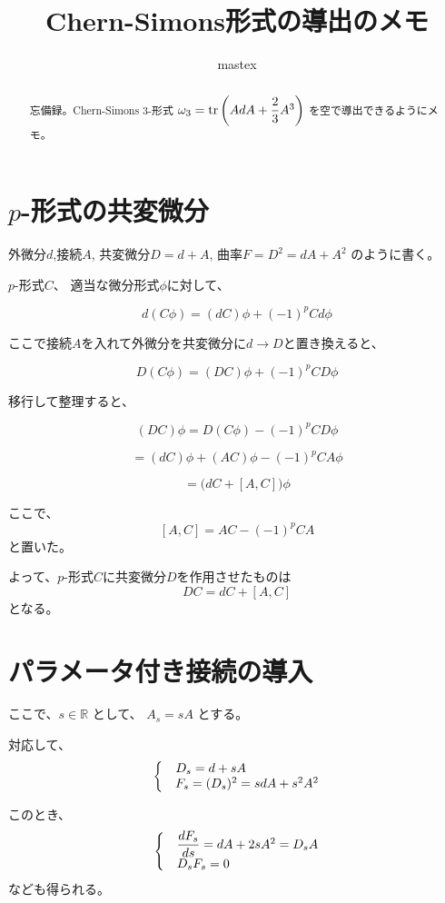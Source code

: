 \documentclass[uplatex]{jsarticle}
\title{
Chern-Simons形式の導出のメモ
}
\author{
mastex
}
\begin{document}
\maketitle

\begin{abstract}
	忘備録。Chern-Simons 3-形式
	$\omega_{3} = {\rm tr} \left( {AdA + \dfrac{2}{3}A^{3}} \right) $
	を空で導出できるようにメモ。
\end{abstract}

\section{$p$-形式の共変微分}


外微分$d$,接続$A$,
共変微分$D=d+A$,
曲率$F=D^{2} = dA+A^{2}$
のように書く。

$p$-形式$C$、
適当な微分形式$\phi$に対して、

$$
	d(C\phi)
	=(dC)\phi + (-1)^{p}Cd\phi
$$

ここで接続$A$を入れて外微分を共変微分に$d \to D$と置き換えると、

$$
	D(C\phi)
	=(DC)\phi + (-1)^{p}CD\phi
$$

移行して整理すると、

$$
	(DC)\phi
	= D(C\phi) - (-1)^{p}CD\phi
$$

$$
	= (dC) \phi + (AC) \phi - (-1)^{p}CA\phi
$$

$$
	= \big( dC + [A,C] \big) \phi
$$

ここで、
$$
	[A,C]
	=
	AC - (-1)^{p}CA
$$
と置いた。

よって、$p$-形式$C$に共変微分$D$を作用させたものは
$$
	DC = dC + [A,C]
$$
となる。


\section{パラメータ付き接続の導入}

ここで、$s \in \mathbb{R}$ として、 $A_{s} = sA$ とする。

対応して、
$$
	\left\{
	\begin{matrix}
		 & \hspace{-57pt} D_{s} = d + sA           \\
		 & F_{s} = (D_{s})^{2} = sdA + s^{2} A^{2}
	\end{matrix}
	\right.
$$

このとき、
$$
	\left\{
	\begin{matrix}
		 & \dfrac{dF_{s}}{ds} = dA + 2sA^{2} = D_{s} A \\
		 & \hspace{-70pt} D_{s} F_{s} = 0
	\end{matrix}
	\right.
$$
なども得られる。
\end{document}
